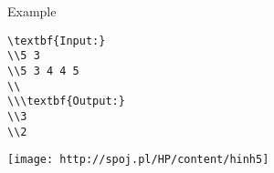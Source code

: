 Example
\begin{verbatim}
\textbf{Input:}
\\5 3
\\5 3 4 4 5
\\
\\\textbf{Output:}
\\3
\\2\end{verbatim}


\texttt{[image: http://spoj.pl/HP/content/hinh5]}